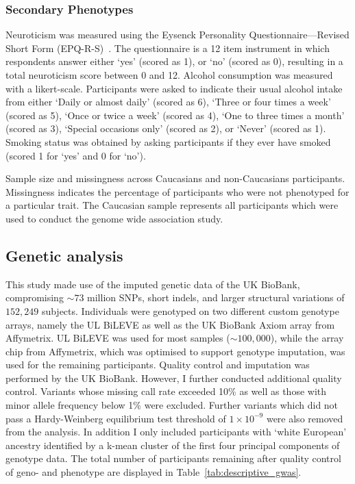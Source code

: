 \subsubsection{Secondary Phenotypes}
\label{ssub:sec_pheno}

Neuroticism was measured using the Eysenck Personality Questionnaire---Revised Short Form (EPQ-R-S)~\cite{Eysenck1985}. 
The questionnaire is a 12 item instrument in which respondents answer either `yes' (scored as 1), or `no' (scored as 0),
resulting in a total neuroticism score between 0 and 12.
Alcohol consumption was measured with a likert-scale.
Participants were asked to indicate their usual alcohol intake from either `Daily or almost daily' (scored as 6), `Three or four times a week' (scored as 5), `Once or twice a week' (scored as 4), `One to three times a month' (scored as 3), `Special occasions only' (scored as 2), or `Never' (scored as 1).
Smoking status was obtained by asking participants if they ever have smoked (scored 1 for `yes' and 0 for `no').


\begin{table}[!htpb]
	\centering
	\resizebox{\textwidth}{!}{}
  \caption{
    Sample size and missingness across Caucasians and non-Caucasians participants.
    Missingness indicates the percentage of participants who were not phenotyped for a particular trait.
    The Caucasian sample represents all participants which were used to conduct the genome wide association study.
}\label{tab:descriptive_gwas} 
\end{table}

\subsection{Genetic analysis}
\label{sub:genetic_analysis}
This study made use of the imputed genetic data of the UK BioBank, compromising $\sim73$ million SNPs, short indels, and larger structural variations of $152,249$ subjects.
Individuals were genotyped on two different custom genotype arrays, namely the UL BiLEVE as well as the UK BioBank Axiom array from Affymetrix. 
UL BiLEVE was used for most samples ($\sim100,000$), while the array chip from Affymetrix, which was optimised to support genotype imputation, was used for the remaining participants. 
Quality control and imputation was performed by the UK BioBank.
However, I further conducted additional quality control.
Variants whose missing call rate exceeded 10\% as well as those with minor allele frequency below 1\% were excluded.
Further variants which did not pass a Hardy-Weinberg equilibrium test threshold of $1\times10^{-9}$ were also removed from the analysis.
In addition I only included participants with `white European' ancestry identified by a k-mean cluster of the first four principal components of genotype data.
The total number of participants remaining after quality control of geno- and phenotype are displayed in Table~\ref{tab:descriptive_gwas}.

